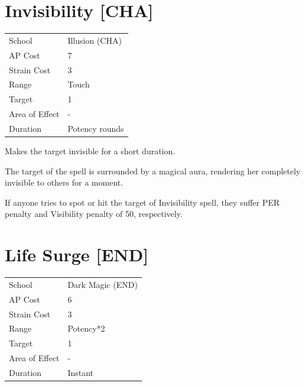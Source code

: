 \documentclass[11pt,a4paper,twocolumn]{book}
\begin{document}
\section*{Invisibility [CHA]}
{
	\begin{tabu} to 75mm{| X[l,4] | X[l,7] |}
		\hline
		School 			& Illusion (CHA) 		\\
        AP Cost	      	& 7 					\\
        Strain Cost     & 3 					\\
        Range     		& Touch 				\\
        Target      	& 1						\\
        Area of Effect  & -  	 				\\
        Duration     	& Potency rounds		\\ \hline
	\end{tabu}
		
}

\medskip

Makes the target invisible for a short duration.

The target of the spell is surrounded by a magical aura, rendering her completely invisible to others for a moment.

If anyone tries to spot or hit the target of Invisibility spell, they suffer PER penalty and Visibility penalty of 50, respectively.

\vfill


\section*{Life Surge [END]}
{
	\begin{tabu} to 75mm{| X[l,4] | X[l,7] |}
		\hline
		School 			& Dark Magic (END) 		\\
        AP Cost	      	& 6 					\\
        Strain Cost     & 3 					\\
        Range     		& Potency*2 			\\
        Target      	& 1						\\
        Area of Effect  & -  	 				\\
        Duration     	& Instant				\\ \hline
	\end{tabu}
		
}
\end{document}
